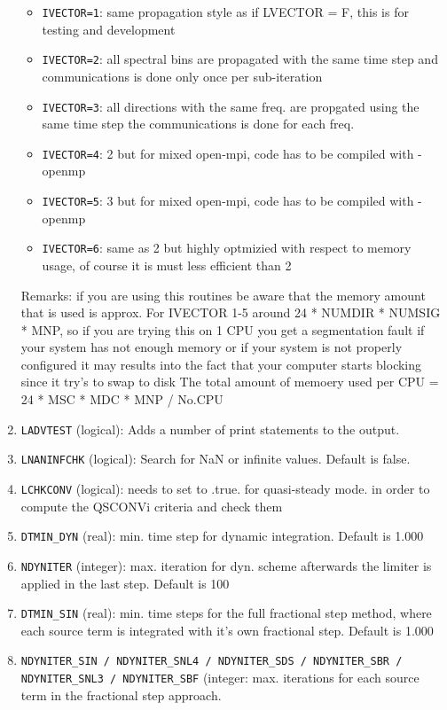 \documentclass[12pt]{amsart}
\begin{document}
\begin{enumerate}
  \begin{itemize}
  \item {\tt IVECTOR=1}: same propagation style as if LVECTOR = F, this is for testing and development
  \item {\tt IVECTOR=2}: all spectral bins are propagated with the same time step and communications is done only once per sub-iteration
  \item {\tt IVECTOR=3}: all directions with the same freq. are propgated using the same time step the communications is done for each freq.
  \item {\tt IVECTOR=4}: 2 but for mixed open-mpi, code has to be compiled with -openmp
  \item {\tt IVECTOR=5}: 3 but for mixed open-mpi, code has to be compiled with -openmp
  \item {\tt IVECTOR=6}: same as 2 but highly optmizied with respect to memory usage, of course it is must less efficient than 2
  \end{itemize}
Remarks: if you are using this routines be aware that the memory amount that is used is approx.
For IVECTOR 1-5 around 24 * NUMDIR * NUMSIG * MNP, so if you are trying this on 1 CPU
you get a segmentation fault if your system has not enough memory or
if your system is not properly configured it may results into the fact that your computer
starts blocking since it try's to swap to disk
The total amount of memoery used per CPU = 24 * MSC * MDC * MNP / No.CPU
\item {\tt LADVTEST} (logical): Adds a number of print statements to the output.
\item {\tt LNANINFCHK} (logical): Search for NaN or infinite values. Default is false.

\item {\tt LCHKCONV} (logical):  needs to set to .true. for quasi-steady mode. in order to compute the QSCONVi criteria and check them
\item {\tt DTMIN\_DYN} (real): min. time step for dynamic integration. Default is 1.000
\item {\tt NDYNITER} (integer): max. iteration for dyn. scheme afterwards the limiter is applied in the last step. Default is 100
\item {\tt DTMIN\_SIN} (real): min. time steps for the full fractional step method, where each source term is integrated with it's own fractional step. Default is 1.000

\item {\tt NDYNITER\_SIN / NDYNITER\_SNL4 / NDYNITER\_SDS / NDYNITER\_SBR / NDYNITER\_SNL3 / NDYNITER\_SBF} (integer: max. iterations for each source term in the fractional step approach. 
  

\end{enumerate}
\end{document}
